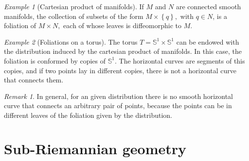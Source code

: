 \documentclass [xcolor=svgnames, t] {beamer}
\theoremstyle{definition}
\theoremstyle{plain}
\theoremstyle{remark}
\newtheorem{ex}{Example}
\newtheorem{rem}{Remark}
\begin{document}
\begin{frame}
\begin{ex}[Cartesian product of manifolds]\label{ex:product_foliation}
	If $ M $ and $ N $ are connected smooth manifolds, the collection of subsets of the form $ M\times \left\{ q \right\}, $ with $ q\in N $, is a foliation of $ M\times N, $ each of whose leaves is diffeomorphic to $ M. $  	
\end{ex}

\begin{ex}[Foliations on a torus]
	The torus $ T= \mathbb{S}^1\times \mathbb{S}^1 $ can be endowed with the distribution induced by the cartesian product of manifolds. In this case, the foliation is conformed by copies of $ \mathbb{S}^1. $ The horizontal curves are segments of this copies, and if two points lay in different copies, there is not a horizontal curve that connects them.
\end{ex}

\begin{rem}
	In general, for an given distribution there is no smooth horizontal curve that connects an arbitrary pair of points, because the points can be in different leaves of the foliation given by the distribution.
\end{rem}
\end{frame}

\section{Sub-Riemannian geometry}
\end{document}
